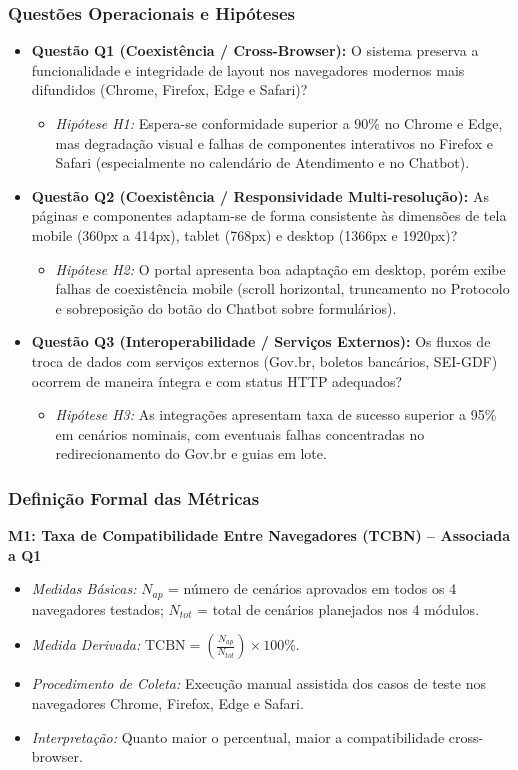 \documentclass[12pt]{article}
\begin{document}
\subsubsection{Questões Operacionais e Hipóteses}
\begin{itemize}
    \item \textbf{Questão Q1 (Coexistência / Cross-Browser):} O sistema preserva a funcionalidade e integridade de layout nos navegadores modernos mais difundidos (Chrome, Firefox, Edge e Safari)?
    \begin{itemize}
        \item \textit{Hipótese H1:} Espera-se conformidade superior a 90\% no Chrome e Edge, mas degradação visual e falhas de componentes interativos no Firefox e Safari (especialmente no calendário de Atendimento e no Chatbot).
    \end{itemize}
    \item \textbf{Questão Q2 (Coexistência / Responsividade Multi-resolução):} As páginas e componentes adaptam-se de forma consistente às dimensões de tela mobile (360px a 414px), tablet (768px) e desktop (1366px e 1920px)?
    \begin{itemize}
        \item \textit{Hipótese H2:} O portal apresenta boa adaptação em desktop, porém exibe falhas de coexistência mobile (scroll horizontal, truncamento no Protocolo e sobreposição do botão do Chatbot sobre formulários).
    \end{itemize}
    \item \textbf{Questão Q3 (Interoperabilidade / Serviços Externos):} Os fluxos de troca de dados com serviços externos (Gov.br, boletos bancários, SEI-GDF) ocorrem de maneira íntegra e com status HTTP adequados?
    \begin{itemize}
        \item \textit{Hipótese H3:} As integrações apresentam taxa de sucesso superior a 95\% em cenários nominais, com eventuais falhas concentradas no redirecionamento do Gov.br e guias em lote.
    \end{itemize}
\end{itemize}

\subsubsection{Definição Formal das Métricas}
\textbf{M1: Taxa de Compatibilidade Entre Navegadores (TCBN) -- Associada a Q1}
\begin{itemize}
    \item \textit{Medidas Básicas:} $N_{ap}$ = número de cenários aprovados em todos os 4 navegadores testados; $N_{tot}$ = total de cenários planejados nos 4 módulos.
    \item \textit{Medida Derivada:} $\text{TCBN} = \left( \frac{N_{ap}}{N_{tot}} \right) \times 100\%$.
    \item \textit{Procedimento de Coleta:} Execução manual assistida dos casos de teste nos navegadores Chrome, Firefox, Edge e Safari.
    \item \textit{Interpretação:} Quanto maior o percentual, maior a compatibilidade cross-browser.
\end{itemize}
\end{document}
